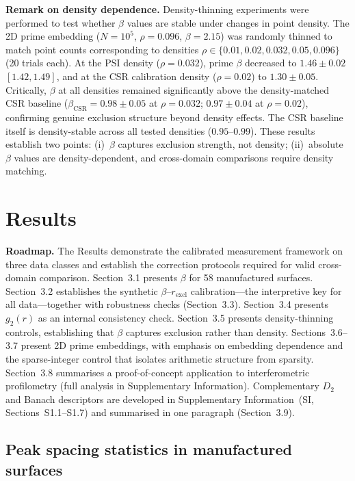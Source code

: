 \documentclass[final,1p,times]{elsarticle}
\theoremstyle{definition}
\begin{document}
\textbf{Remark on density dependence.} Density-thinning experiments were
performed to test whether $\beta$ values are stable under changes in
point density. The 2D prime embedding ($N=10^5$, $\rho=0.096$,
$\beta=2.15$) was randomly thinned to match point counts corresponding
to densities $\rho \in \{0.01, 0.02, 0.032, 0.05, 0.096\}$ (20 trials
each). At the PSI density ($\rho=0.032$), prime $\beta$ decreased to
$1.46\pm0.02$ $[1.42,1.49]$, and at the CSR calibration density
($\rho=0.02$) to $1.30\pm0.05$. Critically, $\beta$ at all densities
remained significantly above the density-matched CSR baseline
($\beta_{\text{CSR}}=0.98\pm0.05$ at $\rho=0.032$; $0.97\pm0.04$ at
$\rho=0.02$), confirming genuine exclusion structure beyond density
effects. The CSR baseline itself is density-stable across all tested
densities ($0.95$--$0.99$). These results establish two points:
(i)~$\beta$ captures exclusion strength, not density; (ii)~absolute
$\beta$ values are density-dependent, and cross-domain comparisons
require density matching.

\section{Results}

\textbf{Roadmap.} The Results demonstrate the calibrated measurement
framework on three data classes and establish the correction protocols
required for valid cross-domain comparison. Section~3.1 presents
$\beta$ for 58 manufactured surfaces. Section~3.2 establishes the
synthetic $\beta$--$r_{\text{excl}}$ calibration---the interpretive
key for all data---together with robustness checks (Section~3.3).
Section~3.4 presents $g_2(r)$ as an internal consistency check.
Section~3.5 presents density-thinning controls, establishing that
$\beta$ captures exclusion rather than density. Sections~3.6--3.7
present 2D prime embeddings, with emphasis on embedding dependence
and the sparse-integer control that isolates arithmetic structure
from sparsity. Section~3.8 summarises a proof-of-concept application
to interferometric profilometry (full analysis in Supplementary
Information). Complementary $D_2$ and Banach descriptors are
developed in Supplementary Information~(SI, Sections~S1.1--S1.7)
and summarised in one paragraph (Section~3.9).

\subsection{Peak spacing statistics in manufactured surfaces}
\label{sec:fv-surfaces}
\end{document}
